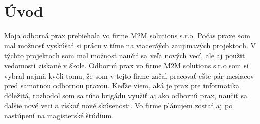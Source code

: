 \chapter{Úvod} %

Moja odborná prax prebiehala vo firme M2M solutions s.r.o. Počas praxe som mal možnosť vyskúšať si prácu v tíme  na viaceráých zaujimavých projektoch. V týchto projektoch som mal možnosť naučiť sa veľa nových vecí, ale aj použiť vedomosti získané v škole. Odbornú prax vo firme M2M solutions s.r.o som si vybral  najmä kvôli tomu, že som v tejto firme začal pracovať ešte pár mesiacov pred samotnou odbornou praxou. Keďže viem, aká je prax pre informatika dôležitá, rozhodol som sa túto brigádu využiť aj ako odbornú prax, naučiť sa ďalšie nové veci a získať nové skúsenosti. Vo firme plánujem zostať aj po nastúpení na magisterské štúdium.


